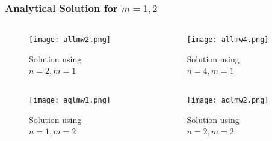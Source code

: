     \begin{frame}\frametitle{Analytical Solution for $m=1,2$}
    \vspace{-7 mm}
      \begin{columns}[T]
        \begin{column}{.5\textwidth}
      
              \begin{figure}
              \centering
              \texttt{[image: allmw2.png]}
              \caption{Solution using $n=2,m=1$}
              \label{fig_e_vs_n_f1}
              \end{figure}

        \end{column}
      \begin{column}{.5\textwidth}

              \begin{figure}
              \centering
              \texttt{[image: allmw4.png]}
              \caption{Solution using $n=4,m=1$}
              \label{fig_e_vs_n_f2}
              \end{figure}

      \end{column}
    \end{columns}

    \vspace{-6 mm}

    \begin{columns}[T]
      \begin{column}{.5\textwidth}
      
              \begin{figure}
              \centering
              \texttt{[image: aqlmw1.png]}
              \caption{Solution using $n=1,m=2$}
              \label{fig_e_vs_n_f1}
              \end{figure}

      \end{column}
      \begin{column}{.5\textwidth}
              \begin{figure}
              \centering
              \texttt{[image: aqlmw2.png]}
              \caption{Solution using $n=2,m=2$}
              \label{fig_e_vs_n_f2}
              \end{figure}

        \end{column}
      \end{columns}
    \end{frame}


